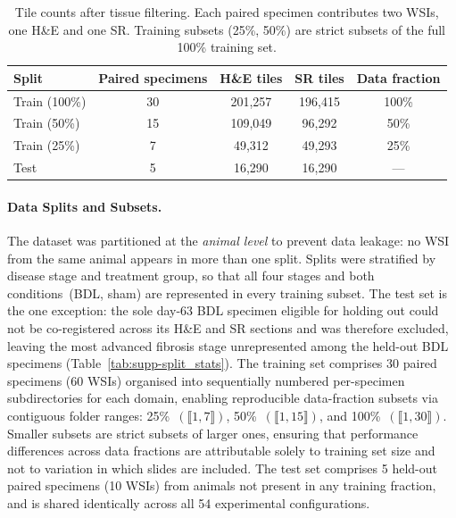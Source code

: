 \begin{table}[h]
\centering
\caption{Tile counts after tissue filtering. Each paired specimen contributes two
WSIs, one H\&E and one SR. Training subsets (25\%, 50\%) are
strict subsets of the full 100\% training set.}
\label{tab:supp-tile_counts}
\begin{tabular}{lcccc}
\toprule
\textbf{Split} & \textbf{Paired specimens} & \textbf{H\&E tiles} & \textbf{SR tiles} & \textbf{Data fraction} \\
\midrule
Train (100\%) & 30 & 201{,}257 & 196{,}415 & 100\% \\
Train (50\%)  & 15 & 109{,}049 &  96{,}292 & 50\%  \\
Train (25\%)  &  7 &  49{,}312 &  49{,}293 & 25\%  \\
Test          &  5 &  16{,}290 &  16{,}290 & ---   \\
\bottomrule
\end{tabular}
\end{table}

\paragraph{Data Splits and Subsets.}
\label{sec:supp-splits}

The dataset was partitioned at the \textit{animal level} to prevent data leakage:
no WSI from the same animal appears in more than one split.
Splits were stratified by disease stage and treatment group, so that all four
stages and both conditions~(BDL, sham) are represented in every training subset.
The test set is the one exception: the sole day-63 BDL specimen eligible for
holding out could not be co-registered across its H\&E and SR sections and was
therefore excluded, leaving the most advanced fibrosis stage unrepresented among
the held-out BDL specimens (Table~\ref{tab:supp-split_stats}).
The training set comprises 30 paired specimens (60 WSIs) organised into sequentially
numbered per-specimen subdirectories for each domain, enabling reproducible
data-fraction subsets via contiguous folder ranges:
25\%~$(\llbracket 1,7 \rrbracket)$, 50\%~$(\llbracket 1,15 \rrbracket)$, and
100\%~$(\llbracket 1,30 \rrbracket)$.
Smaller subsets are strict subsets of larger ones, ensuring that performance
differences across data fractions are attributable solely to training set size and
not to variation in which slides are included.
The test set comprises 5 held-out paired specimens (10 WSIs) from animals not present
in any training fraction, and is shared identically across all 54 experimental configurations.

